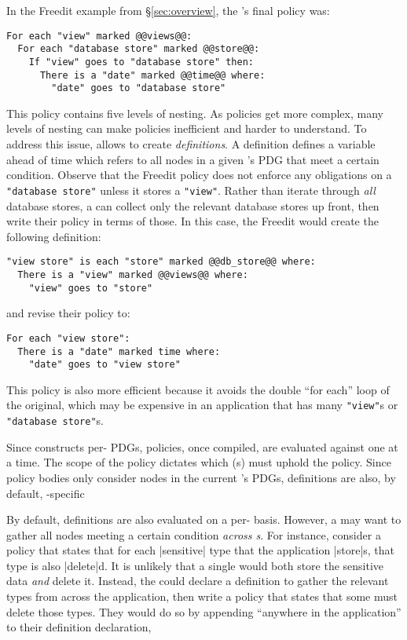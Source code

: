 In the Freedit example from \S\ref{sec:overview}, the \ce{}'s final policy was:
\begin{lstlisting}[language=CNL]
For each "view" marked @@views@@:
  For each "database store" marked @@store@@:
    If "view" goes to "database store" then:
      There is a "date" marked @@time@@ where:
        "date" goes to "database store"
\end{lstlisting}
This policy contains five levels of nesting.
%
As policies get more complex, many levels of nesting can make policies inefficient and harder to understand.
%
To address this issue, \syslang{} allows \ces{} to create \emph{definitions}.
%
A definition defines a variable ahead of time which refers to all nodes in a given \controller{}'s PDG that meet a certain condition.
%
Observe that the Freedit policy does not enforce any obligations on a \lstinline[language=CNL]|"database store"| unless it stores a \lstinline[language=CNL]|"view"|.
%
Rather than iterate through \emph{all} database stores, 
a \writer{} can collect only the relevant database stores up front,
then write their policy in terms of those.
%
In this case, the Freedit \ce{} would create the following definition:
\begin{lstlisting}[language=CNL]
"view store" is each "store" marked @@db_store@@ where:
  There is a "view" marked @@views@@ where:
    "view" goes to "store"
\end{lstlisting}
and revise their policy to:
\begin{lstlisting}[language=CNL]
For each "view store":
  There is a "date" marked time where:
    "date" goes to "view store" 
\end{lstlisting}
This policy is also more efficient because it avoids the double ``for each'' loop of the original,
which may be expensive in an application that has many \lstinline[language=CNL]|"view"|s or \lstinline[language=CNL]|"database store"|s.
%

Since \sys{} constructs per-\controller{} PDGs,
\syslang{} policies, once compiled, are evaluated against one \controller{} at a time.
%
The scope of the policy dictates which \controller{}(s) must uphold the policy.
%
Since policy bodies only consider nodes in the current \controller{}'s PDGs,
definitions are also, by default, \controller{}-specific

By default, definitions are also evaluated on a per-\controller{} basis.
%
However, a \ce{} may want to gather all nodes meeting a certain condition \emph{across \controller{}s}.
%
For instance, consider a policy that states that for each |sensitive| type that the application |store|s,
that type is also |delete|d.
%
It is unlikely that a single \controller{} would both store the sensitive data \emph{and} delete it.
%
Instead, the \ce{} could declare a definition to gather the relevant types from across the application,
then write a policy that states that some \controller{} must delete those types.
%
They would do so by appending ``anywhere in the application'' to their definition declaration,

